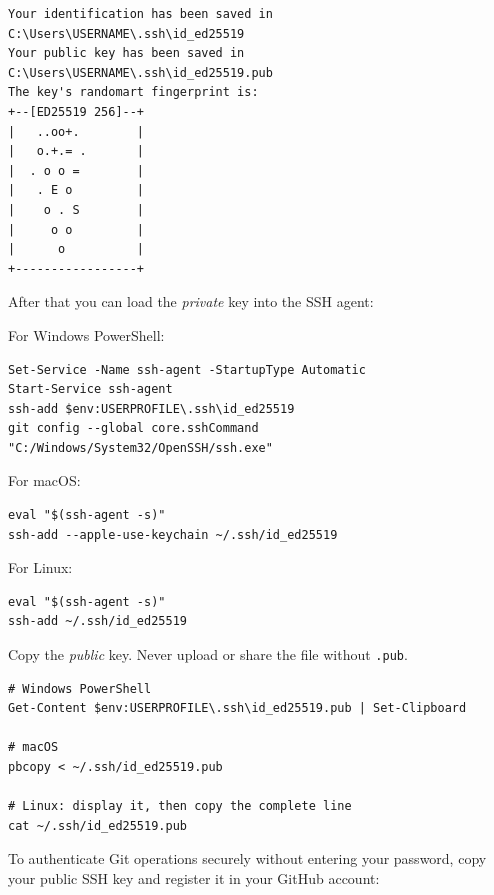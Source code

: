 \begin{lstlisting}[style=utpterminal]
Your identification has been saved in C:\Users\USERNAME\.ssh\id_ed25519
Your public key has been saved in C:\Users\USERNAME\.ssh\id_ed25519.pub
The key's randomart fingerprint is:
+--[ED25519 256]--+
|   ..oo+.        |
|   o.+.= .       |
|  . o o =        |
|   . E o         |
|    o . S        |
|     o o         |
|      o          |
+-----------------+
\end{lstlisting}

After that you can load the \emph{private} key into the SSH agent:

For Windows PowerShell:

\begin{lstlisting}[style=utpterminal]
Set-Service -Name ssh-agent -StartupType Automatic
Start-Service ssh-agent
ssh-add $env:USERPROFILE\.ssh\id_ed25519
git config --global core.sshCommand "C:/Windows/System32/OpenSSH/ssh.exe"
\end{lstlisting}

For macOS:
\begin{lstlisting}[style=utpterminal]
eval "$(ssh-agent -s)"
ssh-add --apple-use-keychain ~/.ssh/id_ed25519
\end{lstlisting}

For Linux:
\begin{lstlisting}[style=utpterminal]
eval "$(ssh-agent -s)"
ssh-add ~/.ssh/id_ed25519
\end{lstlisting}

Copy the \emph{public} key. Never upload or share the file without
\texttt{.pub}.

\begin{lstlisting}[style=utpterminal]
# Windows PowerShell
Get-Content $env:USERPROFILE\.ssh\id_ed25519.pub | Set-Clipboard

# macOS
pbcopy < ~/.ssh/id_ed25519.pub

# Linux: display it, then copy the complete line
cat ~/.ssh/id_ed25519.pub
\end{lstlisting}

\noindent To authenticate Git operations securely without entering your password, copy your public SSH key and register it in your GitHub account:

